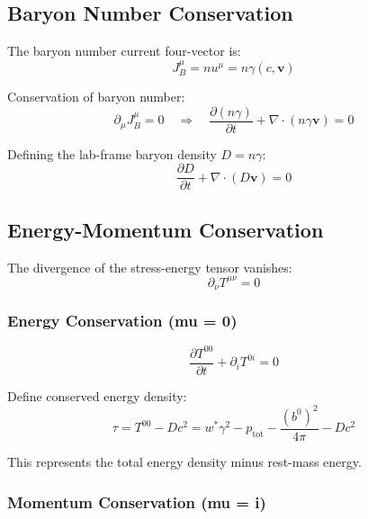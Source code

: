 \documentclass[12pt,a4paper]{article}
\begin{document}
\subsection{Baryon Number Conservation}

The baryon number current four-vector is:
\begin{equation}
J^\mu_B = n u^\mu = n \gamma (c, \bm{v})
\label{eq:baryon_current}
\end{equation}

Conservation of baryon number:
\begin{equation}
\partial_\mu J^\mu_B = 0 \quad \Rightarrow \quad
\frac{\partial (n\gamma)}{\partial t} + \nabla \cdot (n\gamma \bm{v}) = 0
\label{eq:baryon_conservation}
\end{equation}

Defining the lab-frame baryon density $D = n\gamma$:
\begin{equation}
\frac{\partial D}{\partial t} + \nabla \cdot (D\bm{v}) = 0
\label{eq:D_conservation}
\end{equation}

\subsection{Energy-Momentum Conservation}

The divergence of the stress-energy tensor vanishes:
\begin{equation}
\partial_\nu T^{\mu\nu} = 0
\label{eq:Tmunu_conservation}
\end{equation}

\subsubsection{Energy Conservation (mu = 0)}

\begin{equation}
\frac{\partial T^{00}}{\partial t} + \partial_i T^{0i} = 0
\label{eq:energy_cons_1}
\end{equation}

Define conserved energy density:
\begin{equation}
\tau = T^{00} - D c^2 = w^* \gamma^2 - p_\text{tot} - \frac{(b^0)^2}{4\pi} - D c^2
\label{eq:tau_def}
\end{equation}

This represents the total energy density minus rest-mass energy.

\subsubsection{Momentum Conservation (mu = i)}
\end{document}

